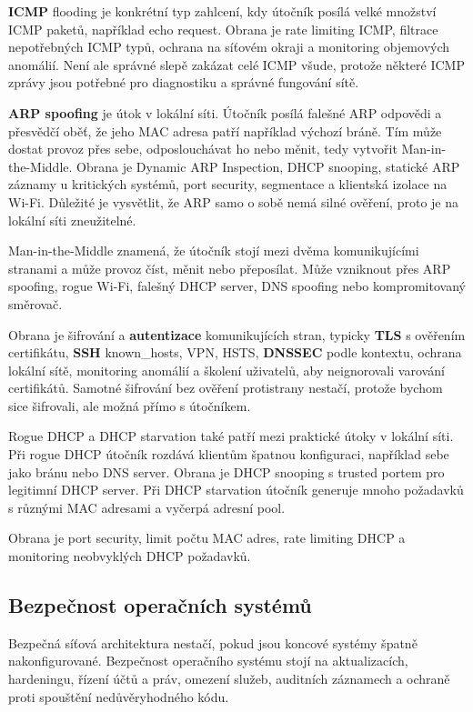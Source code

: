\textbf{ICMP} flooding je konkrétní typ zahlcení, kdy útočník posílá velké množství ICMP paketů, například echo request. Obrana je rate limiting ICMP, filtrace nepotřebných ICMP typů, ochrana na síťovém okraji a monitoring objemových anomálií. Není ale správné slepě zakázat celé ICMP všude, protože některé ICMP zprávy jsou potřebné pro diagnostiku a správné fungování sítě.

\textbf{ARP spoofing} je útok v lokální síti. Útočník posílá falešné ARP odpovědi a přesvědčí oběť, že jeho MAC adresa patří například výchozí bráně. Tím může dostat provoz přes sebe, odposlouchávat ho nebo měnit, tedy vytvořit Man-in-the-Middle. Obrana je Dynamic ARP Inspection, DHCP snooping, statické ARP záznamy u kritických systémů, port security, segmentace a klientská izolace na Wi-Fi. Důležité je vysvětlit, že ARP samo o sobě nemá silné ověření, proto je na lokální síti zneužitelné.

Man-in-the-Middle znamená, že útočník stojí mezi dvěma komunikujícími stranami a může provoz číst, měnit nebo přeposílat. Může vzniknout přes ARP spoofing, rogue Wi-Fi, falešný DHCP server, DNS spoofing nebo kompromitovaný směrovač.

Obrana je šifrování a \textbf{autentizace} komunikujících stran, typicky \textbf{TLS} s ověřením certifikátu, \textbf{SSH} known\_hosts, VPN, HSTS, \textbf{DNSSEC} podle kontextu, ochrana lokální sítě, monitoring anomálií a školení uživatelů, aby neignorovali varování certifikátů. Samotné šifrování bez ověření protistrany nestačí, protože bychom sice šifrovali, ale možná přímo s útočníkem.

Rogue DHCP a DHCP starvation také patří mezi praktické útoky v lokální síti. Při rogue DHCP útočník rozdává klientům špatnou konfiguraci, například sebe jako bránu nebo DNS server. Obrana je DHCP snooping s trusted portem pro legitimní DHCP server. Při DHCP starvation útočník generuje mnoho požadavků s různými MAC adresami a vyčerpá adresní pool.

Obrana je port security, limit počtu MAC adres, rate limiting DHCP a monitoring neobvyklých DHCP požadavků.

\subsection*{Bezpečnost operačních systémů}

Bezpečná síťová architektura nestačí, pokud jsou koncové systémy špatně nakonfigurované. Bezpečnost operačního systému stojí na aktualizacích, hardeningu, řízení účtů a práv, omezení služeb, auditních záznamech a ochraně proti spouštění nedůvěryhodného kódu.

